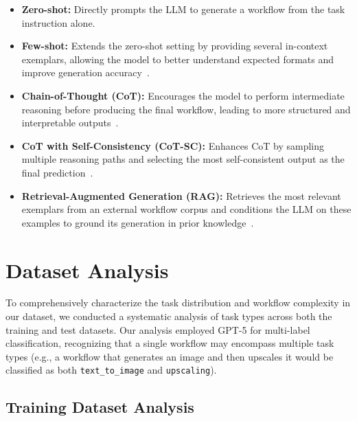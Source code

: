\documentclass[runningheads]{llncs}
\begin{document}
\begin{itemize}
\item \textbf{Zero-shot:} Directly prompts the LLM to generate a workflow from the task instruction alone.
\item \textbf{Few-shot:} Extends the zero-shot setting by providing several in-context exemplars, allowing the model to better understand expected formats and improve generation accuracy~\cite{brown2020language}.
\item \textbf{Chain-of-Thought (CoT):} Encourages the model to perform intermediate reasoning before producing the final workflow, leading to more structured and interpretable outputs~\cite{wei2022chain}.
\item \textbf{CoT with Self-Consistency (CoT-SC):} Enhances CoT by sampling multiple reasoning paths and selecting the most self-consistent output as the final prediction~\cite{wang2022self}.
\item \textbf{Retrieval-Augmented Generation (RAG):} Retrieves the most relevant exemplars from an external workflow corpus and conditions the LLM on these examples to ground its generation in prior knowledge~\cite{lewis2020retrieval}.
\end{itemize}


\section{Dataset Analysis}
\label{sec:dataset_supp}
To comprehensively characterize the task distribution and workflow complexity in our dataset, we conducted a systematic analysis of task types across both the training and test datasets. Our analysis employed GPT-5 for multi-label classification, recognizing that a single workflow may encompass multiple task types (e.g., a workflow that generates an image and then upscales it would be classified as both \texttt{text\_to\_image} and \texttt{upscaling}).

\subsection{Training Dataset Analysis}
\end{document}
